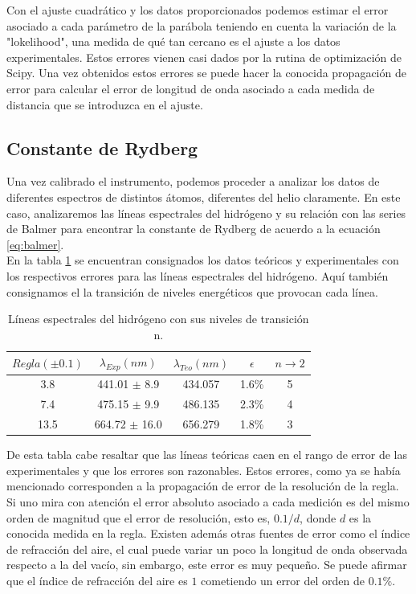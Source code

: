 \documentclass[%
 reprint,
 amsmath,amssymb,
 aps,
]{revtex4-1}
\begin{document}
Con el ajuste cuadrático y los datos proporcionados podemos estimar el error asociado a cada parámetro de la parábola teniendo en cuenta la variación de la "lokelihood", una medida de qué tan cercano es el ajuste a los datos experimentales. Estos errores vienen casi dados por la rutina de optimización de Scipy. Una vez obtenidos estos errores se puede hacer la conocida propagación de error para calcular el error de longitud de onda asociado a cada medida de distancia que se introduzca en el ajuste.\\

\subsection{\label{sec:level2}Constante de Rydberg}
Una vez calibrado el instrumento, podemos proceder a analizar los datos de diferentes espectros de distintos átomos, diferentes del helio claramente. En este caso, analizaremos las líneas espectrales del hidrógeno y su relación con las series de Balmer para encontrar la constante de Rydberg de acuerdo a la ecuación \ref{eq:balmer}.\\

En la tabla \ref{table:hidrogeno} se encuentran consignados los datos teóricos y experimentales con los respectivos errores para las líneas espectrales del hidrógeno. Aquí también consignamos el la transición de niveles energéticos que provocan cada línea.\\

\begin{table}[h!]
\centering
 \begin{tabular}{|c|c|c|c|c|} 
 \hline
 $Regla (\pm0.1) $ & $\lambda_{Exp} (nm)$ & $\lambda_{Teo} (nm)$ & $\epsilon$ & $ n \rightarrow 2 $\\ [0.5ex] 
 \hline\hline
3.8 &	441.01 $\pm$ 8.9 & 434.057 & 1.6\% & 5\\
7.4 &	475.15 $\pm$ 9.9 & 486.135 & 2.3\% & 4\\
13.5 &	664.72 $\pm$ 16.0& 656.279 & 1.8\% & 3\\
[1ex] 
 \hline
 \end{tabular}
 \caption{Líneas espectrales del hidrógeno con sus niveles de transición n.}
 \label{table:hidrogeno}
\end{table}

De esta tabla cabe resaltar que las líneas teóricas caen en el rango de error de las experimentales y que los errores son razonables. Estos errores, como ya se había mencionado corresponden a la propagación de error de la resolución de la regla. Si uno mira con atención el error absoluto asociado a cada medición es del mismo orden de magnitud que el error de resolución, esto es, $0.1/d$, donde $d$ es la conocida medida en la regla. Existen además otras fuentes de error como el índice de refracción del aire, el cual puede variar un poco la longitud de onda observada respecto a la del vacío, sin embargo, este error es muy pequeño. Se puede afirmar que el índice de refracción del aire es $1$ cometiendo un error del orden de $0.1\%$.\\
\end{document}
